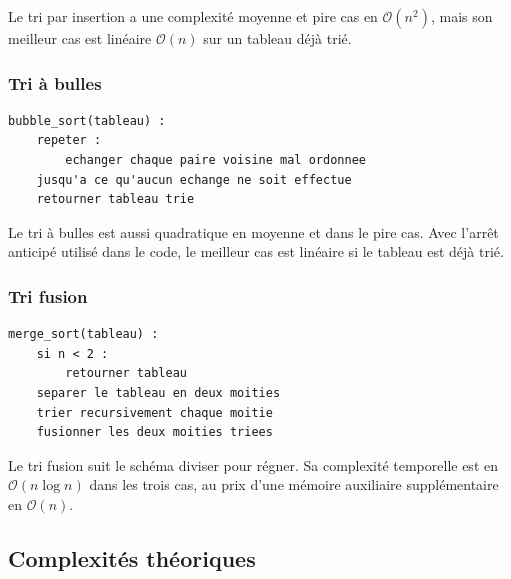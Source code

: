 Le tri par insertion a une complexit\'{e} moyenne et pire cas en
\(\mathcal{O}(n^2)\), mais son meilleur cas est lin\'{e}aire
\(\mathcal{O}(n)\) sur un tableau d\'{e}j\`{a} tri\'{e}.

\subsubsection{Tri \`{a} bulles}\label{subsubsec:tp3-bulles}

\begin{lstlisting}[basicstyle=\ttfamily,label={lst:tp3-bulles}]
bubble_sort(tableau) :
    repeter :
        echanger chaque paire voisine mal ordonnee
    jusqu'a ce qu'aucun echange ne soit effectue
    retourner tableau trie
\end{lstlisting}

Le tri \`{a} bulles est aussi quadratique en moyenne et dans le pire cas.
Avec
l'arr\^{e}t anticip\'{e} utilis\'{e} dans le code, le meilleur cas est lin\'{e}aire
si le tableau est d\'{e}j\`{a} tri\'{e}.

\subsubsection{Tri fusion}\label{subsubsec:tp3-fusion}

\begin{lstlisting}[basicstyle=\ttfamily,label={lst:tp3-fusion}]
merge_sort(tableau) :
    si n < 2 :
        retourner tableau
    separer le tableau en deux moities
    trier recursivement chaque moitie
    fusionner les deux moities triees
\end{lstlisting}

Le tri fusion suit le sch\'{e}ma diviser pour r\'{e}gner.
Sa complexit\'{e}
temporelle est en \(\mathcal{O}(n \log n)\) dans les trois cas, au prix d'une
m\'{e}moire auxiliaire suppl\'{e}mentaire en \(\mathcal{O}(n)\).

\subsection{Complexit\'{e}s th\'{e}oriques}\label{subsec:tp3-complexites}

